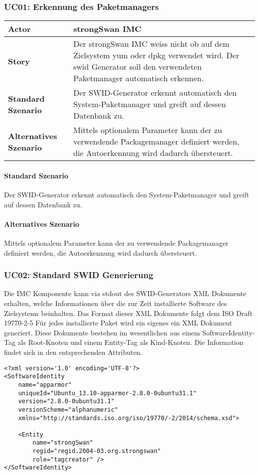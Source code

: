 \subsubsection{UC01: Erkennung des Paketmanagers}

\begin{tabularx}{\textwidth}{lX}
\hline 
\textbf{Actor} & strongSwan IMC \\ 
\hline
\textbf{Story} &
Der strongSwan IMC weiss nicht ob auf dem Zielsystem yum oder dpkg verwendet wird. Der swid Generator soll den verwendeten Paketmanager automatisch erkennen. \\
\hline 
\textbf{Standard Szenario} & 
Der SWID-Generator erkennt automatisch den System-Paketmanager und greift auf
dessen Datenbank zu. \\ 
\hline 
\textbf{Alternatives Szenario} &
Mittels optionalem Parameter kann der zu verwendende Packagemanager definiert
werden, die Autoerkennung wird dadurch übersteuert.
\end{tabularx} 

\paragraph{Standard Szenario}
Der SWID-Generator erkennt automatisch den System-Paketmanager und greift auf
dessen Datenbank zu.

\paragraph{Alternatives Szenario}
Mittels optionalem Parameter kann der zu verwendende Packagemanager definiert
werden, die Autoerkennung wird dadurch übersteuert.

\subsubsection{UC02: Standard SWID Generierung}

Die IMC Komponente kann via stdout des SWID-Generators XML Dokumente erhalten, welche Informationen über die zur Zeit installierte Software des Zielsystems beinhalten.
Das Format dieser XML Dokumente folgt dem ISO Draft 19770-2-5
Für jedes installierte Paket wird ein eigenes ein XML Dokument generiert.
Diese Dokumente bestehen im wesentlichen aus einem SoftwareIdentity-Tag als Root-Knoten und einem Entity-Tag als Kind-Knoten. Die Information findet sich in den entsprechenden Attributen.

\begin{verbatim}
<?xml version='1.0' encoding='UTF-8'?>
<SoftwareIdentity
    name="apparmor"
    uniqueId="Ubuntu_13.10-apparmor-2.8.0-0ubuntu31.1"
    version="2.8.0-0ubuntu31.1"
    versionScheme="alphanumeric"
    xmlns="http://standards.iso.org/iso/19770/-2/2014/schema.xsd">

    <Entity
        name="strongSwan"
        regid="regid.2004-03.org.strongswan"
        role="tagcreator" />
</SoftwareIdentity>
\end{verbatim}

